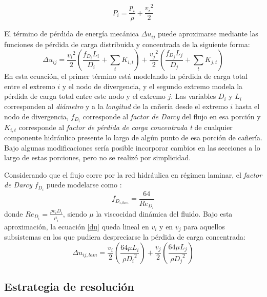 \begin{equation}
P_i = \frac{p_i}{\rho} + \frac{{v_i}^2}{2}
\label{p-eyd}
\end{equation}

El término de pérdida de energía mecánica $\Delta u_{ij}$ puede aproximarse mediante las funciones de pérdida de carga distribuida y concentrada \cite{white} de la siguiente forma:
\begin{equation}
\Delta u_{ij} = \frac{{v_i}^2}{2} \left ( \frac{f_{D_i} L_{i}}{D_i} + \sum_t K_{i,t} \right ) + \frac{{v_j}^2}{2} \left ( \frac{f_{D_j} L_{j}}{D_j} + \sum_t K_{j,t} \right )
\label{du}
\end{equation}
En esta ecuación, el primer término está modelando la pérdida de carga total entre el extremo $i$ y el nodo de divergencia,
y el segundo extremo modela la pérdida de carga total entre este nodo y el extremo $j$.
Las variables $D_i$ y $L_i$ corresponden al \textit{diámetro} y a la \textit{longitud} de la cañería desde el extremo $i$ hasta el nodo de divergencia,
$f_{D_i}$ corresponde al \textit{factor de Darcy} del flujo en esa porción
y $K_{i,t}$ corresponde al \textit{factor de pérdida de carga concentrada t} de cualquier componente hidráulico presente lo largo de algún punto de esa porción de cañería.
Bajo algunas modificaciones sería posible incorporar cambios en las secciones a lo largo de estas porciones, pero no se realizó por simplicidad.

Considerando que el flujo corre por la red hidráulica en régimen laminar, el \textit{factor de Darcy} $f_{D_i}$ puede modelarse como \cite{white}:
\begin{equation}
f_{D_{{i},lam}} = \frac{64}{Re_{D_i}}
\label{f-lam}
\end{equation}
donde $Re_{D_i}=\frac{\rho v_i D_i} {\mu_i}$, siendo $\mu$ la viscocidad dinámica del fluido.
Bajo esta aproximación, la ecuación \ref{du} queda lineal en $v_i$ y en $v_j$ para aquellos subsistemas en los que pudiera despreciarse la pérdida de carga concentrada:
\begin{equation}
\Delta u_{ij,lam} = \frac{{v_i}}{2} \left ( \frac{64 \mu L_{i}}{\rho {D_i}^{2}} \right ) + \frac{{v_j}}{2} \left ( \frac{64 \mu L_{j}}{\rho {D_j}^{2}} \right )
\label{du}
\end{equation}


\subsection*{Estrategia de resolución}
\label{resolucion-net}


